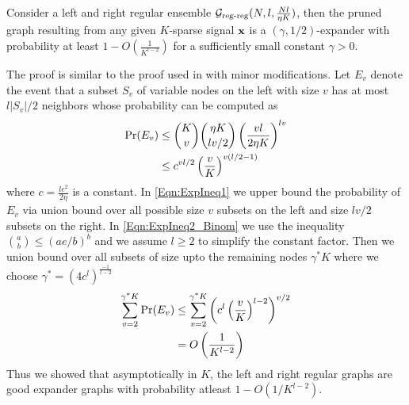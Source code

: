 \documentclass[conference,onecolumn]{IEEEtran}
\begin{document}
\begin{lemma}\label{Lem:ExpGraph}
Consider a left and right regular ensemble $\mathcal{G}_{\text{reg-reg}}(N,l,\frac{Nl}{\eta K})$, then the pruned graph resulting from any given $K$-sparse signal $\mathbf{x}$ is a $(\gamma,1/2)$-expander with probability at least $1-O\left(\frac{1}{K^{l-2}}\right)$ for a sufficiently small constant $\gamma >0$.
\end{lemma}
\begin{IEEEproof}
The proof is similar to the proof used in \cite{li2015subdraft} with minor modifications. Let $E_{v}$ denote the event that a subset $S_{v}$ of variable nodes on the left with size $v$ has at most $l|S_v|/2$ neighbors whose probability can be computed as
\begin{align}
\text{Pr}(E_v)&\leq \binom{K}{v}\binom{\eta K}{lv/2}\left(\frac{vl}{2\eta K}\right)^{lv}\label{Eqn:ExpIneq1}\\
				&\leq c^{vl/2}\left(\frac{v}{K}\right)^{v(l/2-1)}\label{Eqn:ExpIneq2_Binom}
\end{align}
where $c=\frac{le^{2}}{2\eta}$ is a constant. In \eqref{Eqn:ExpIneq1} we upper bound the probability of $E_v$ via union bound over all possible size $v$ subsets on the left and size $lv/2$ subsets on the right. In \eqref{Eqn:ExpIneq2_Binom} we use the inequality $\binom{a}{b}\leq \left(ae/b\right)^b$ and we assume $l\geq 2$ to simplify the constant factor. Then we union bound over all subsets of size upto the remaining nodes $\gamma^{*} K$ where we choose $\gamma^{*}=\left(4c^l\right)^{\frac{-1}{l-2}}$
\begin{align*}
\sum_{v=2}^{\gamma^{*} K}\text{Pr}(E_{v})&\leq \sum_{v=2}^{\gamma^{*} K}\left(c^{l}\left(\frac{v}{K}\right)^{l-2}\right)^{v/2}\\
														&=O\left(\frac{1}{K^{l-2}}\right)
\end{align*}
Thus we showed that asymptotically in $K$, the left and right regular graphs are good expander graphs with probability atleast $1-O(1/K^{l-2}).$
\end{IEEEproof}
\vspace{1ex}
\end{document}
